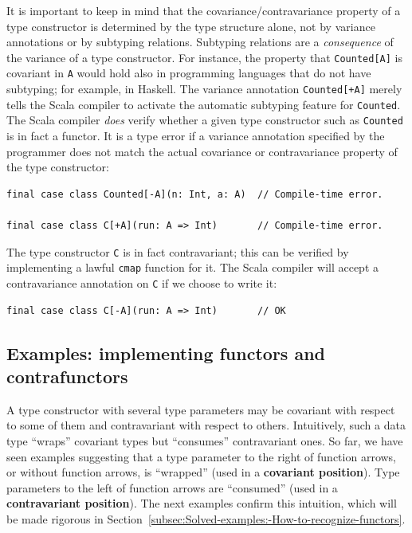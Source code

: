 It is important to keep in mind that the covariance/contravariance
property of a type constructor is determined by the type structure
alone, not by variance annotations or by subtyping relations. Subtyping
relations are a \emph{consequence} of the variance of a type constructor.
For instance, the property that \lstinline!Counted[A]! is covariant
in \lstinline!A! would hold also in programming languages that do
not have subtyping; for example, in Haskell. The variance annotation
\lstinline!Counted[+A]! merely tells the Scala compiler to activate
the automatic subtyping feature for \lstinline!Counted!. The Scala
compiler \emph{does} verify whether a given type constructor such
as \lstinline!Counted! is in fact a functor. It is a type error if
a variance annotation specified by the programmer does not match the
actual covariance or contravariance property of the type constructor:
\begin{lstlisting}
final case class Counted[-A](n: Int, a: A)  // Compile-time error.

final case class C[+A](run: A => Int)       // Compile-time error.
\end{lstlisting}
The type constructor \lstinline!C! is in fact contravariant; this
can be verified by implementing a lawful \lstinline!cmap! function
for it. The Scala compiler will accept a contravariance annotation
on \lstinline!C! if we choose to write it:
\begin{lstlisting}
final case class C[-A](run: A => Int)       // OK
\end{lstlisting}


\subsection{Examples: implementing functors and contrafunctors}

A type constructor with several type parameters may be covariant with
respect to some of them and contravariant with respect to others.
Intuitively, such a data type \textsf{``}wraps\textsf{''} covariant types but \textsf{``}consumes\textsf{''}
contravariant ones. So far, we have seen examples suggesting that
a type parameter to the right of function arrows, or without function
arrows, is \textsf{``}wrapped\textsf{''} (used in a \textbf{covariant position}).
Type parameters to the left of function arrows are \textsf{``}consumed\textsf{''}
(used in a \textbf{contravariant position}).
The next examples confirm this intuition, which will be made rigorous
in Section~\ref{subsec:Solved-examples:-How-to-recognize-functors}.

